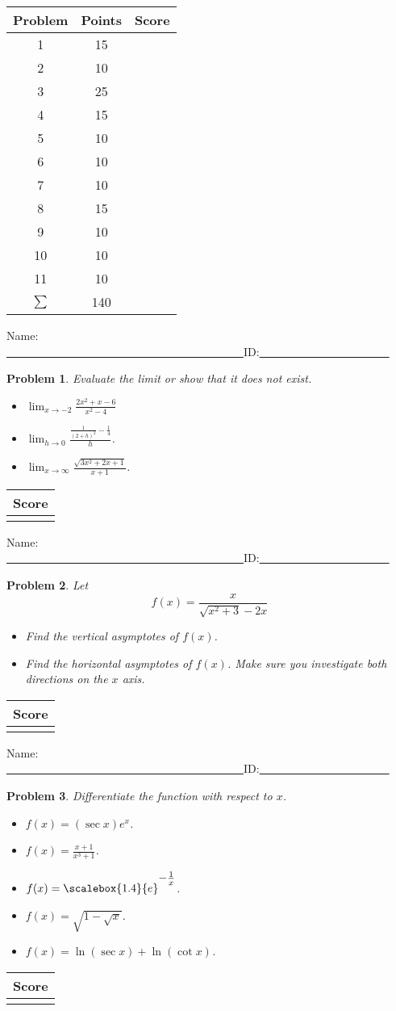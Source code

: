 \documentclass[12pt]{article}
\newtheorem{problem}{Problem}
\newcommand{\finishUMBExamPage}{
\vfill
\hfill \begin{tabular}{|c|}\hline Score\\\hline  \\\hline \end{tabular}
}
\newcommand{\startUMBExamPage}{\newpage
\noindent Name: \underline{~~~~~~~~~~~~~~~~~~~~~~~~~~~~~~~~~~~~~~~~~~}\hfill ID:\underline{~~~~~~~~~~~~~~~~~~~~~~~}}
\begin{document}
\vfill
{\Large
\begin{tabular}{|c|c|c|}\hline
Problem & Points & Score\\\hline\hline
1& 15 &\\\hline
2& 10 &\\\hline
3& 25 &\\\hline
4& 15 &\\\hline
5& 10 &\\\hline
6& 10 &\\\hline
7& 10 &\\\hline
8&  15 &\\\hline
9&  10 &\\\hline
10& 10 &\\\hline
11& 10 &\\\hline
$\sum$ & 140 &\\\hline
\end{tabular}
}
\startUMBExamPage
\begin{problem}
Evaluate the limit or show that it does not exist.
\begin{itemize}
\item $\displaystyle \lim_{x\to -2} \frac{2x^2+x-6}{x^2-4}$

\vfill
\item $ \displaystyle \lim_{h\to 0} \frac{\frac{1}{(2+h)^2}-\frac{1}{4}}{h}  $.

\vfill
\item $ \displaystyle \lim_{x\to \infty} \frac{\sqrt{3x^2+2x+1}}{x+1} $. 
\end{itemize}


\end{problem}
\finishUMBExamPage
\startUMBExamPage
\begin{problem}
Let 
\[
f(x)= \frac{x}{\sqrt{x^2+3} -2x}
\]
\begin{itemize}
\item Find the vertical asymptotes of $f(x)$.
\item Find the horizontal asymptotes of $f(x)$. Make sure you investigate both directions on the $x$ axis.
\end{itemize}
\end{problem}
\finishUMBExamPage
\startUMBExamPage
\begin{problem}
Differentiate the function with respect to $x$.
\begin{itemize}
\item $\displaystyle f(x)=(\sec x )e^{x}$.

\vfill
\item $\displaystyle f(x)= \frac{x+1}{x^3+1}$.
\vfill
\newpage
\item    $\displaystyle f(x)={\scalebox{1.4}{ e}} 
^{{\raisebox{1ex}{$-\frac{1}{x}$}}}
$.

\vfill\item $f(x)=\sqrt{1-\sqrt{x}}$.

\vfill
\item $f(x)=\ln (\sec x) +\ln (\cot x)$.

\end{itemize}
\end{problem}
\finishUMBExamPage
\end{document}

